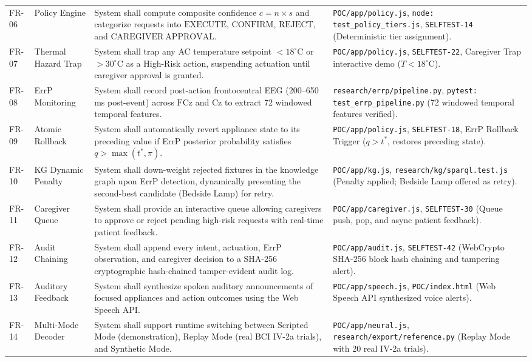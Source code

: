 \documentclass[12pt,a4paper]{report}
\begin{document}
\begin{xltabular}{\textwidth}{p{1.2cm} p{2.2cm} X p{4.2cm}}
\addlinespace
FR-06 & Policy Engine & System shall compute composite confidence $c = n \times s$ and categorize requests into $\mathrm{EXECUTE}$, $\mathrm{CONFIRM}$, $\mathrm{REJECT}$, and $\mathrm{CAREGIVER\ APPROVAL}$. & \texttt{POC/app/policy.js}, \texttt{node: test\_policy\_tiers.js}, \texttt{SELFTEST-14} (Deterministic tier assignment). \\
\addlinespace
FR-07 & Thermal Hazard Trap & System shall trap any AC temperature setpoint $< 18^\circ\text{C}$ or $> 30^\circ\text{C}$ as a High-Risk action, suspending actuation until caregiver approval is granted. & \texttt{POC/app/policy.js}, \texttt{SELFTEST-22}, Caregiver Trap interactive demo ($T < 18^\circ\text{C}$). \\
\addlinespace
FR-08 & ErrP Monitoring & System shall record post-action frontocentral EEG (200--650\,ms post-event) across $\mathrm{FCz}$ and $\mathrm{Cz}$ to extract 72 windowed temporal features. & \texttt{research/errp/pipeline.py}, \texttt{pytest: test\_errp\_pipeline.py} (72 windowed temporal features verified). \\
\addlinespace
FR-09 & Atomic Rollback & System shall automatically revert appliance state to its preceding value if ErrP posterior probability satisfies $q > \max(t^*, \pi)$. & \texttt{POC/app/policy.js}, \texttt{SELFTEST-18}, ErrP Rollback Trigger ($q > t^*$, restores preceding state). \\
\addlinespace
FR-10 & KG Dynamic Penalty & System shall down-weight rejected fixtures in the knowledge graph upon ErrP detection, dynamically presenting the second-best candidate (Bedside Lamp) for retry. & \texttt{POC/app/kg.js}, \texttt{research/kg/sparql.test.js} (Penalty applied; Bedside Lamp offered as retry). \\
\addlinespace
FR-11 & Caregiver Queue & System shall provide an interactive queue allowing caregivers to approve or reject pending high-risk requests with real-time patient feedback. & \texttt{POC/app/caregiver.js}, \texttt{SELFTEST-30} (Queue push, pop, and async patient feedback). \\
\addlinespace
FR-12 & Audit Chaining & System shall append every intent, actuation, ErrP observation, and caregiver decision to a SHA-256 cryptographic hash-chained tamper-evident audit log. & \texttt{POC/app/audit.js}, \texttt{SELFTEST-42} (WebCrypto SHA-256 block hash chaining and tampering alert). \\
\addlinespace
FR-13 & Auditory Feedback & System shall synthesize spoken auditory announcements of focused appliances and action outcomes using the Web Speech API. & \texttt{POC/app/speech.js}, \texttt{POC/index.html} (Web Speech API synthesized voice alerts). \\
\addlinespace
FR-14 & Multi-Mode Decoder & System shall support runtime switching between Scripted Mode (demonstration), Replay Mode (real BCI IV-2a trials), and Synthetic Mode. & \texttt{POC/app/neural.js}, \texttt{research/export/reference.py} (Replay Mode with 20 real IV-2a trials). \\
\end{xltabular}
\end{document}
